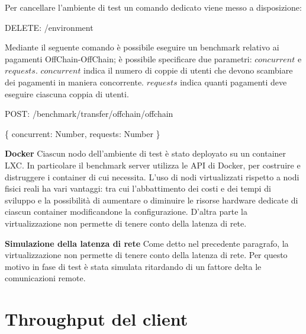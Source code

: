 \documentclass[12pt,italian,]{book}
\newenvironment{Shaded}{}{}
\newcommand{\DataTypeTok}[1]{\textcolor[rgb]{0.56,0.13,0.00}{#1}}
\newcommand{\NormalTok}[1]{#1}
\newcommand{\OperatorTok}[1]{\textcolor[rgb]{0.40,0.40,0.40}{#1}}
\newcommand{\SpecialStringTok}[1]{\textcolor[rgb]{0.73,0.40,0.53}{#1}}
\begin{document}
Per cancellare l'ambiente di test un comando dedicato viene messo a disposizione:

\begin{Shaded}
\begin{Highlighting}[]
\NormalTok{DELETE}\OperatorTok{:} \SpecialStringTok{/environment}
\end{Highlighting}
\end{Shaded}

Mediante il seguente comando è possibile eseguire un benchmark relativo ai pagamenti OffChain-OffChain; è possibile specificare due parametri: \(concurrent\) e \(requests\). \(concurrent\) indica il numero di coppie di utenti che devono scambiare dei pagamenti in maniera concorrente. \(requests\) indica quanti pagamenti deve eseguire ciascuna coppia di utenti.

\begin{Shaded}
\begin{Highlighting}[]
\NormalTok{POST}\OperatorTok{:} \SpecialStringTok{/benchmark/transfer/offchain/offchain}
\end{Highlighting}
\end{Shaded}

\begin{Shaded}
\begin{Highlighting}[]
\OperatorTok{\{}
    \DataTypeTok{concurrent}\OperatorTok{:}\NormalTok{ Number}\OperatorTok{,}
    \DataTypeTok{requests}\OperatorTok{:}\NormalTok{ Number}
\OperatorTok{\}}
\end{Highlighting}
\end{Shaded}

\textbf{\textbf{Docker}} Ciascun nodo dell'ambiente di test è stato deployato su un container LXC. In particolare il benchmark server utilizza le API di Docker, per costruire e distruggere i container di cui necessita. L'uso di nodi virtualizzati rispetto a nodi fisici reali ha vari vantaggi: tra cui l'abbattimento dei costi e dei tempi di sviluppo e la possibilità di aumentare o diminuire le risorse hardware dedicate di ciascun container modificandone la configurazione. D'altra parte la virtualizzazione non permette di tenere conto della latenza di rete.

\textbf{\textbf{Simulazione della latenza di rete}} Come detto nel precedente paragrafo, la virtualizzazione non permette di tenere conto della latenza di rete. Per questo motivo in fase di test è stata simulata ritardando di un fattore delta le comunicazioni remote.

\hypertarget{throughput-del-client}{%
\section{Throughput del client}\label{throughput-del-client}}
\end{document}
